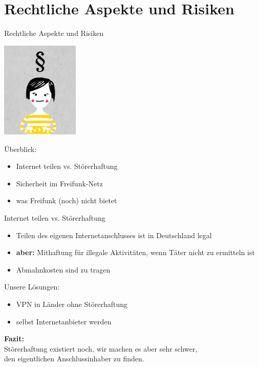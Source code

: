 \documentclass[10pt,handout]{beamer}
\begin{document}
\section{Rechtliche Aspekte und Risiken}
\begin{frame}{Rechtliche Aspekte und Risiken}
\begin{Row}
\begin{Cell}{1}
\vspace{0.1cm}
\includegraphics[width=3.7cm]{images/recht}
\end{Cell}
\begin{Cell}{2}
\vspace{1cm}
Überblick:
\begin{itemize}[<+->]
\item Internet teilen vs. Störerhaftung
\item Sicherheit im Freifunk-Netz
\item was Freifunk (noch) nicht bietet
\end{itemize}
\end{Cell}
\end{Row}
\end{frame}

\begin{frame}{Internet teilen vs. Störerhaftung}
	\begin{itemize}
		\item Teilen des eigenen Internetanschlusses ist in Deutschland legal
		\pause\item \textbf{aber:} Mithaftung für illegale Aktivitäten, wenn Täter nicht zu ermitteln ist
		\pause\item Abmahnkosten sind zu tragen
	\end{itemize}
	
	\vfill
	\pause
	
	Unsere Lösungen:
	\begin{itemize}
		\item VPN in Länder ohne Störerhaftung
		\item selbst Internetanbieter werden
	\end{itemize}
	
	\vfill
	\centering
	\pause \textbf{Fazit:}\\Störerhaftung existiert noch, wir machen es aber sehr schwer,\\den eigentlichen Anschlussinhaber zu finden.

\end{frame}
\end{document}
